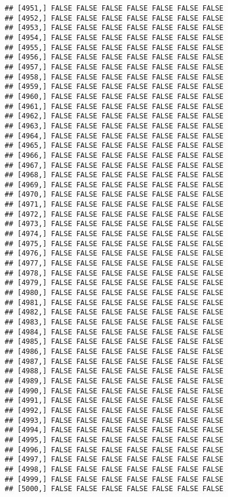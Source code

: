 \documentclass[
]{article}
\begin{document}
\begin{verbatim}
## [4951,] FALSE FALSE FALSE FALSE FALSE FALSE FALSE
## [4952,] FALSE FALSE FALSE FALSE FALSE FALSE FALSE
## [4953,] FALSE FALSE FALSE FALSE FALSE FALSE FALSE
## [4954,] FALSE FALSE FALSE FALSE FALSE FALSE FALSE
## [4955,] FALSE FALSE FALSE FALSE FALSE FALSE FALSE
## [4956,] FALSE FALSE FALSE FALSE FALSE FALSE FALSE
## [4957,] FALSE FALSE FALSE FALSE FALSE FALSE FALSE
## [4958,] FALSE FALSE FALSE FALSE FALSE FALSE FALSE
## [4959,] FALSE FALSE FALSE FALSE FALSE FALSE FALSE
## [4960,] FALSE FALSE FALSE FALSE FALSE FALSE FALSE
## [4961,] FALSE FALSE FALSE FALSE FALSE FALSE FALSE
## [4962,] FALSE FALSE FALSE FALSE FALSE FALSE FALSE
## [4963,] FALSE FALSE FALSE FALSE FALSE FALSE FALSE
## [4964,] FALSE FALSE FALSE FALSE FALSE FALSE FALSE
## [4965,] FALSE FALSE FALSE FALSE FALSE FALSE FALSE
## [4966,] FALSE FALSE FALSE FALSE FALSE FALSE FALSE
## [4967,] FALSE FALSE FALSE FALSE FALSE FALSE FALSE
## [4968,] FALSE FALSE FALSE FALSE FALSE FALSE FALSE
## [4969,] FALSE FALSE FALSE FALSE FALSE FALSE FALSE
## [4970,] FALSE FALSE FALSE FALSE FALSE FALSE FALSE
## [4971,] FALSE FALSE FALSE FALSE FALSE FALSE FALSE
## [4972,] FALSE FALSE FALSE FALSE FALSE FALSE FALSE
## [4973,] FALSE FALSE FALSE FALSE FALSE FALSE FALSE
## [4974,] FALSE FALSE FALSE FALSE FALSE FALSE FALSE
## [4975,] FALSE FALSE FALSE FALSE FALSE FALSE FALSE
## [4976,] FALSE FALSE FALSE FALSE FALSE FALSE FALSE
## [4977,] FALSE FALSE FALSE FALSE FALSE FALSE FALSE
## [4978,] FALSE FALSE FALSE FALSE FALSE FALSE FALSE
## [4979,] FALSE FALSE FALSE FALSE FALSE FALSE FALSE
## [4980,] FALSE FALSE FALSE FALSE FALSE FALSE FALSE
## [4981,] FALSE FALSE FALSE FALSE FALSE FALSE FALSE
## [4982,] FALSE FALSE FALSE FALSE FALSE FALSE FALSE
## [4983,] FALSE FALSE FALSE FALSE FALSE FALSE FALSE
## [4984,] FALSE FALSE FALSE FALSE FALSE FALSE FALSE
## [4985,] FALSE FALSE FALSE FALSE FALSE FALSE FALSE
## [4986,] FALSE FALSE FALSE FALSE FALSE FALSE FALSE
## [4987,] FALSE FALSE FALSE FALSE FALSE FALSE FALSE
## [4988,] FALSE FALSE FALSE FALSE FALSE FALSE FALSE
## [4989,] FALSE FALSE FALSE FALSE FALSE FALSE FALSE
## [4990,] FALSE FALSE FALSE FALSE FALSE FALSE FALSE
## [4991,] FALSE FALSE FALSE FALSE FALSE FALSE FALSE
## [4992,] FALSE FALSE FALSE FALSE FALSE FALSE FALSE
## [4993,] FALSE FALSE FALSE FALSE FALSE FALSE FALSE
## [4994,] FALSE FALSE FALSE FALSE FALSE FALSE FALSE
## [4995,] FALSE FALSE FALSE FALSE FALSE FALSE FALSE
## [4996,] FALSE FALSE FALSE FALSE FALSE FALSE FALSE
## [4997,] FALSE FALSE FALSE FALSE FALSE FALSE FALSE
## [4998,] FALSE FALSE FALSE FALSE FALSE FALSE FALSE
## [4999,] FALSE FALSE FALSE FALSE FALSE FALSE FALSE
## [5000,] FALSE FALSE FALSE FALSE FALSE FALSE FALSE

\end{verbatim}
\end{document}
